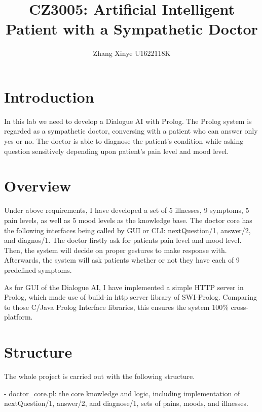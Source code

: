 \documentclass[11pt]{article}
\begin{document}
%
\author{Zhang Xinye U1622118K}
\title{CZ3005: Artificial Intelligent \protect\\ Patient with a Sympathetic Doctor}
\maketitle

\section*{Introduction}
In this lab we need to develop a Dialogue AI with Prolog. The Prolog system is regarded as a sympathetic doctor, conversing with a patient who can answer only yes or no. The doctor is able to diagnose the patient's condition while asking question sensitively depending upon patient's pain level and mood level. 

\section*{Overview}
Under above requirements, I have developed a set of 5 illnesses, 9 symptoms, 5 pain levels, as well as 5 mood levels as the knowledge base. The doctor core has the following interfaces being called by GUI or CLI: nextQuestion/1, answer/2, and diagnos/1. The doctor firstly ask for patients pain level and mood level. Then, the system will decide on proper gestures to make response with. Afterwards, the system will ask patients whether or not they have each of 9 predefined symptoms.

As for GUI of the Dialogue AI, I have implemented a simple HTTP server in Prolog, which made use of build-in http server library of SWI-Prolog. Comparing to those C/Java Prolog Interface libraries, this ensures the system 100\% cross-platform.

\section*{Structure}
The whole project is carried out with the following structure.

- doctor\_core.pl: the core knowledge and logic, including implementation of nextQuestion/1, answer/2, and diagnose/1, sets of pains, moods, and illnesses. 
\end{document}
